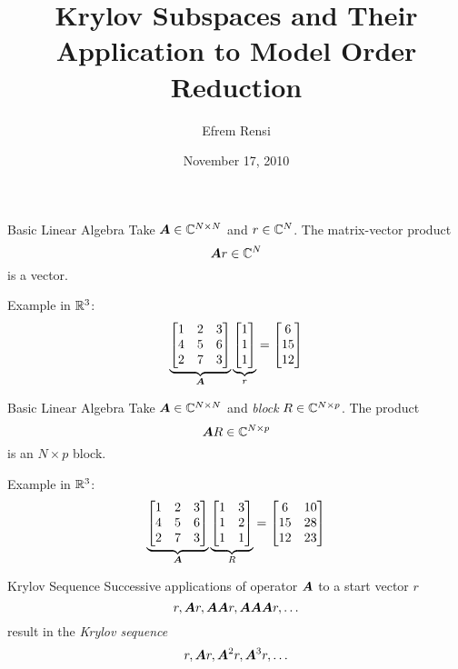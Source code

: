 \documentclass{beamer}
\date{November 17, 2010}
\title[Krylov Subspaces]{Krylov Subspaces and Their Application to Model Order Reduction}
\author[]{Efrem Rensi}
\institute{UC Davis Applied Mathematics}
\begin{document}
\begin{frame}
  \titlepage
  \begin{figure}
  	\centering
  	    \hfill
  \end{figure}
\end{frame}



\begin{frame}{Basic Linear Algebra}%
Take $\bm{A}\in\mathbb{C}^{N\times N}$ and $r\in\mathbb{C}^{N}$. The matrix-vector product
\[
  \bm{A} r \in \mathbb{C}^N
\]
is a vector. 

Example in $\mathbb{R}^3$:
\[
\underbrace{\begin{bmatrix} 1& 2& 3\\4& 5& 6\\ 2 &7 &3\end{bmatrix}}_{\bm{A}} \underbrace{\begin{bmatrix} 1\\1\\1\end{bmatrix}}_r
= \begin{bmatrix} 6 \\15 \\12 \end{bmatrix}
\]
\end{frame}

\begin{frame}{Basic Linear Algebra}%
Take $\bm{A}\in\mathbb{C}^{N\times N}$ and \emph{block} $R\in\mathbb{C}^{N\times p}$. The product
\[
  \bm{A} R \in \mathbb{C}^{N\times p}
\]
is an $N\times p$ block. 

Example in $\mathbb{R}^3$:
\[
\underbrace{\begin{bmatrix} 1& 2& 3\\4& 5& 6\\ 2 &7 &3\end{bmatrix}}_{\bm{A}} \underbrace{\begin{bmatrix} 1 & 3\\1&2\\1&1\end{bmatrix}}_R
= \begin{bmatrix} 6&10\\15&28\\12&23\end{bmatrix}
\]
\end{frame}


\begin{frame}{Krylov Sequence}%
Successive applications of operator $\bm{A}$ to a start vector $r$ 
\[
r, \bm{A} r,  \bm{A} \bm{A} r, \bm{A} \bm{A} \bm{A} r, \ldots  
\]
result in the \emph{Krylov sequence}
\[
r, \bm{A} r,  \bm{A}^2r, \bm{A}^3r, \ldots  
\]

\end{frame}
\end{document}
